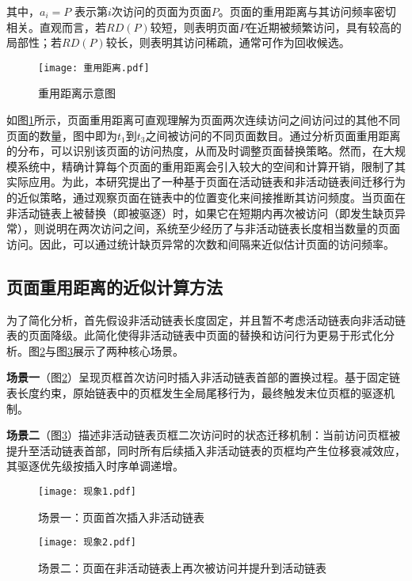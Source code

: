 其中，\(a_i=P\) 表示第\(i\)次访问的页面为页面\(P\)。页面的重用距离与其访问频率密切相关。直观而言，若\(RD(P)\)较短，则表明页面\(P\)在近期被频繁访问，具有较高的局部性；若\(RD(P)\)较长，则表明其访问稀疏，通常可作为回收候选。

\begin{figure}[htbp]
  \centering
  \texttt{[image: 重用距离.pdf]}
  \caption{重用距离示意图}
  \label{fig:refault_distance}
\end{figure}


如图\ref{fig:refault_distance}所示，页面重用距离可直观理解为页面两次连续访问之间访问过的其他不同页面的数量，图中即为\(t_1\)到\(t_3\)之间被访问的不同页面数目。通过分析页面重用距离的分布，可以识别该页面的访问热度，从而及时调整页面替换策略。然而，在大规模系统中，精确计算每个页面的重用距离会引入较大的空间和计算开销，限制了其实际应用。为此，本研究提出了一种基于页面在活动链表和非活动链表间迁移行为的近似策略，通过观察页面在链表中的位置变化来间接推断其访问频度。当页面在非活动链表上被替换（即被驱逐）时，如果它在短期内再次被访问（即发生缺页异常），则说明在两次访问之间，系统至少经历了与非活动链表长度相当数量的页面访问。因此，可以通过统计缺页异常的次数和间隔来近似估计页面的访问频率。

\subsection{页面重用距离的近似计算方法}
\label{sec:重用距离的近似推导}
为了简化分析，首先假设非活动链表长度固定，并且暂不考虑活动链表向非活动链表的页面降级。此简化使得非活动链表中页面的替换和访问行为更易于形式化分析。图\ref{fig:现象1}与图\ref{fig:现象2}展示了两种核心场景。

\textbf{场景一}（图\ref{fig:现象1}）呈现页框首次访问时插入非活动链表首部的置换过程。基于固定链表长度约束，原始链表中的页框发生全局尾移行为，最终触发末位页框的驱逐机制。

\textbf{场景二}（图\ref{fig:现象2}）描述非活动链表页框二次访问时的状态迁移机制：当前访问页框被提升至活动链表首部，同时所有后续插入非活动链表的页框均产生位移衰减效应，其驱逐优先级按插入时序单调递增。
\begin{figure}[htbp]
  \centering
  \texttt{[image: 现象1.pdf]}
  \caption{场景一：页面首次插入非活动链表}
  \label{fig:现象1}
\end{figure}

\begin{figure}[htbp]
  \centering
  \texttt{[image: 现象2.pdf]}
  \caption{场景二：页面在非活动链表上再次被访问并提升到活动链表}
  \label{fig:现象2}
\end{figure}

